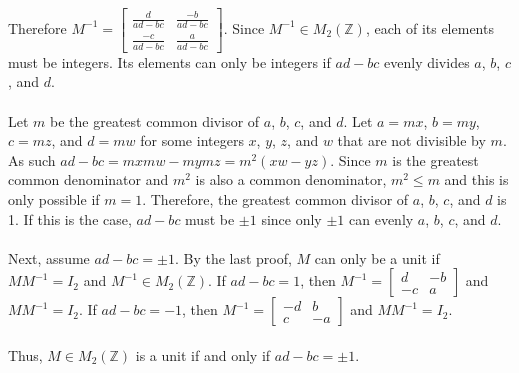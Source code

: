 \documentclass{article}
\begin{document}
\begin{enumerate}
Therefore $M^{-1} = \begin{bmatrix} \frac{d}{ad-bc} & \frac{-b}{ad-bc} \\
\frac{-c}{ad-bc} & \frac{a}{ad-bc}\end{bmatrix}$.  Since $M^{-1} \in M_2(\mathbb{Z})$,
each of its elements must be integers.  Its elements can only be
integers if $ad-bc$ evenly divides $a$, $b$, $c$, and $d$. \\
\\
Let $m$ be the greatest common divisor of $a$, $b$, $c$, and $d$.
Let $a = mx$, $b = my$, $c = mz$, and $d = mw$ for some integers
$x$, $y$, $z$, and $w$ that are not divisible by $m$.
As such $ad-bc = mxmw - mymz = m^2(xw - yz)$.  Since $m$ is the greatest common
denominator and $m^2$ is also a common denominator, $m^2 \leq m$ and this is
only possible if $m = 1$.  Therefore, the greatest common divisor of
$a$, $b$, $c$, and $d$ is 1.  If this is the case, $ad-bc$ must be $\pm1$ since
only $\pm1$ can evenly $a$, $b$, $c$, and $d$.
\\
\\
Next, assume $ad - bc = \pm1$.  By the last proof, $M$ can only be a unit if
$MM^{-1} = I_2$ and $M^{-1} \in M_2(\mathbb{Z})$.  If $ad - bc = 1$, then
$M^{-1} = \begin{bmatrix} d & -b \\ -c & a \end{bmatrix}$ and $MM^{-1} = I_2$.
If $ad - bc = -1$, then $M^{-1} = \begin{bmatrix} -d & b \\ c & -a \end{bmatrix}$
and $MM^{-1} = I_2$.
\\
\\
Thus, $M \in M_2(\mathbb{Z})$ is a unit if and only if $ad - bc = \pm1$.


\end{enumerate}
\end{document}
